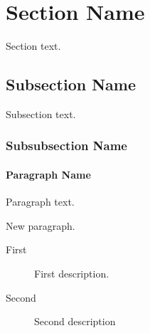\documentclass[
  draft
]{agujournal2025}
\begin{document}
\begin{abstract}
    Abstract text body with some more content.
     \begin{plainlanguagesummary}
            Plain language summary text body with some more content.
     \end{plainlanguagesummary}
\end{abstract}


\section{Section Name}  %

Section text.


\subsection{Subsection Name}

Subsection text.


\subsubsection{Subsubsection Name}


\paragraph{Paragraph Name}
Paragraph text.
%

New paragraph.
%
\begin{description}
    \item[First] First description.
    \item[Second] Second description
\end{description}
\end{document}
